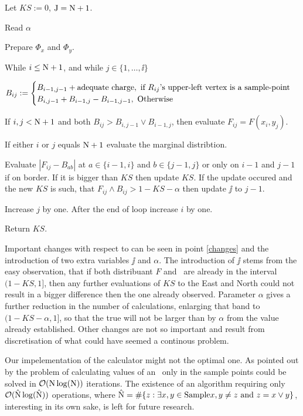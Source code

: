\begin{algorithm}
	\item Let $KS := 0$, $\mathrm{J} = \mathrm{N}+1$. 
	\item Read $\alpha$
	\item Prepare $\Phi_x$ and $\Phi_y$.
	\item While $i \leq \mathrm{N}+1$, and while $j \in \{ 1, \dots, \ii \}$ 
	\begin{algorithm}
		\item $B_{ij} := 
			\begin{cases} 
				B_{i-1,j-1} + \text{adequate charge}, \text{ if $R_{ij}$'s upper-left vertex is a sample-point} \cr
				B_{i,j-1} + B_{i-1,j} -  B_{i-1,j-1}, \text{ Otherwise} 
			\end{cases}$	

		\item If $i,j < \mathrm{N}+1$ and both $B_{ij} > B_{i,j-1} \vee B_{i-1,j}$, then evaluate $F_{ij} = F(x_i, y_j)$.

		\item If either $i$ or $j$ equals $\mathrm{N}+1$ evaluate the marginal distribtion.

		\item\label{changes} Evaluate $|F_{ij} - B_{ab}|$ at $a \in \{i-1,i\}$ and $b \in \{j-1,j\}$ or only on $i-1$ and $j-1$ if on border. If it is bigger than $KS$ then update $KS$. If the update occured and the new $KS$ is such, that $F_{ij}\wedge B_{ij} > 1 - KS - \alpha$ then update $\jj$ to $j-1$.

		\item Increase $j$ by one. After the end of loop increase $i$ by one.

	\end{algorithm}
	\item Return $KS$.
\end{algorithm}

Important changes with respect to \cite{NiVingron} can be seen in point \ref{changes} and the introduction of two extra variables $\jj$ and $\alpha$. The introduction of $\jj$ stems from the easy observation, that if both distribuant $F$ and \Fecdf\, are already in the interval $(1-KS,1]$, then any further evaluations of $KS$ to the East and North could not result in a bigger difference then the one already observed. Parameter $\alpha$ gives a further reduction in the number of calculations, enlarging that band to $(1-KS-\alpha,1]$, so that the true \KS will not be larger than by $\alpha$ from the value already established. Other changes are not so important and result from discretisation of what could have seemed a continous problem. 

Our impelementation of the \KS calculator might not the optimal one. As pointed out by \citet*{Jon} the problem of calculating values of an \ecdf\, only in the sample points could be solved in $\mathcal{O}(\mathrm{N} \log( \mathrm{N} ))$ iterations. The existence of an algorithm requiring only $\mathcal{O}(\hat{\mathrm{N}} \log( \hat{\mathrm{N}}  ))$ operations, where $\hat{\mathrm{N}} = \# \{ z : \exists x,y \in \text{Sample} x,y \not=z \text{ and } z = x \vee y \}$, interesting in its own sake, is left for future research.

